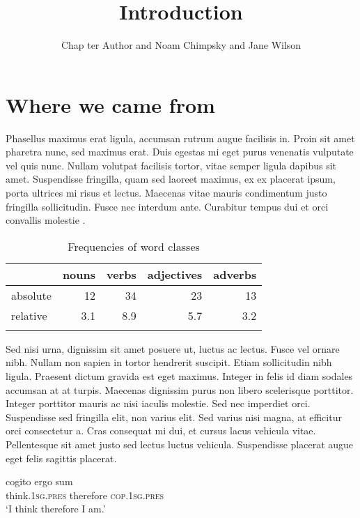 \documentclass[output=paper,colorlinks,citecolor=brown,
]{langscibook}
\author{Chap ter Author\affiliation{University of Eden} and 
        Noam Chimpsky\affiliation{University of Pluto}\orcid{} and  
        Jane Wilson\affiliation{National Institute for Language}\orcid{}}
\title{Introduction}
\begin{document}
\maketitle

\section{Where we came from}
Phasellus maximus erat ligula, accumsan rutrum augue facilisis in. Proin sit amet pharetra nunc, sed maximus erat. Duis egestas mi eget purus venenatis vulputate vel quis nunc. Nullam volutpat facilisis tortor, vitae semper ligula dapibus sit amet. Suspendisse fringilla, quam sed laoreet maximus, ex ex placerat ipsum, porta ultrices mi risus et lectus. Maecenas vitae mauris condimentum justo fringilla sollicitudin. Fusce nec interdum ante. Curabitur tempus dui et orci convallis molestie \citep{Chomsky1957}.

\begin{table}
\caption{Frequencies of word classes}
\label{tab:1:frequencies}
 \begin{tabular}{l rrrr}
  \lsptoprule
            & nouns & verbs  & adjectives & adverbs\\
  \midrule
  absolute  &   12  &    34  &    23      & 13\\
  relative  &   3.1 &   8.9  &    5.7     & 3.2\\
  \lspbottomrule
 \end{tabular}
\end{table}

Sed nisi urna, dignissim sit amet posuere ut, luctus ac lectus. Fusce vel ornare nibh. Nullam non sapien in tortor hendrerit suscipit. Etiam sollicitudin nibh ligula. Praesent dictum gravida est eget maximus. Integer in felis id diam sodales accumsan at at turpis. Maecenas dignissim purus non libero scelerisque porttitor. Integer porttitor mauris ac nisi iaculis molestie. Sed nec imperdiet orci. Suspendisse sed fringilla elit, non varius elit. Sed varius nisi magna, at efficitur orci consectetur a. Cras consequat mi dui, et cursus lacus vehicula vitae. Pellentesque sit amet justo sed lectus luctus vehicula. Suspendisse placerat augue eget felis sagittis placerat.


\ea
\gll cogito                           ergo      sum\\
     think.\textsc{1sg}.\textsc{pres} therefore \textsc{cop}.\textsc{1sg}.\textsc{pres}\\
\glt `I think therefore I am.'
\z
{} %
\end{document}
